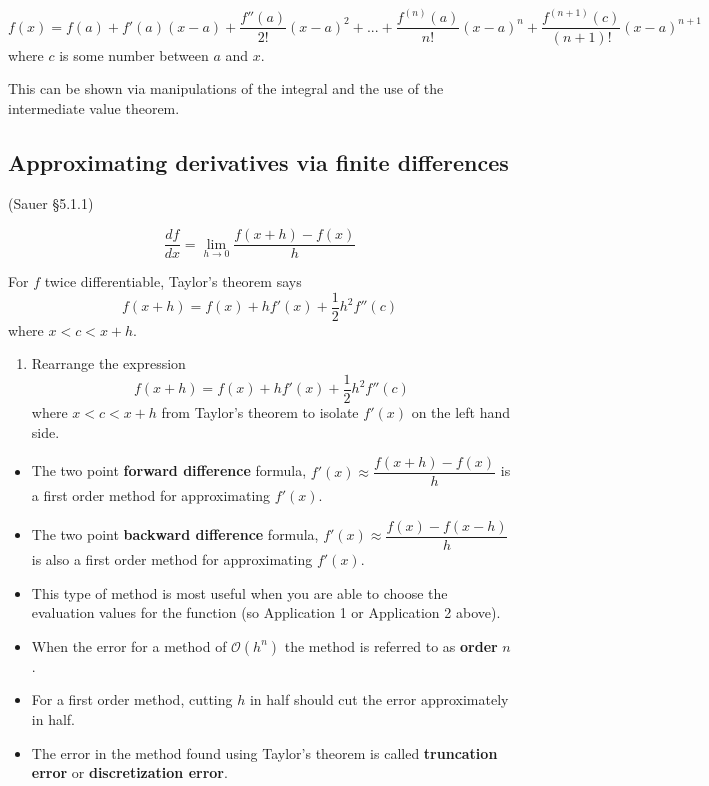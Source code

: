 \documentclass[12pt,letterpaper,noanswers]{exam}
\begin{document}
\[f(x) = f(a) + f'(a)(x-a) + \frac{f''(a)}{2!} (x-a)^2 + ... + \frac{f^{(n)}(a)}{n!}(x-a)^n + \dfrac{f^{(n+1)}(c)}{(n+1)!}(x-a)^{n+1}\]
where $c$ is some number between $a$ and $x$.

This can be shown via manipulations of the integral and the use of the intermediate value theorem.



\subsection*{Approximating derivatives via finite differences}
\begin{tcolorbox}

(Sauer \S 5.1.1)

\[\frac{df}{dx} = \lim\limits_{h\rightarrow 0} \frac{f(x+h)-f(x)}{h}\]

For $f$ twice differentiable, Taylor's theorem says
\[f(x+h) = f(x) + hf'(x) + \frac{1}{2}h^2 f''(c)\] where $x< c< x+h$.
\end{tcolorbox}
\begin{enumerate}[resume=classQ]
\item Rearrange the expression 
\[f(x+h) = f(x) + hf'(x) + \frac{1}{2}h^2 f''(c)\] where $x< c< x+h$
from Taylor's theorem to isolate $f'(x)$ on the left hand side.
\vspace{1in}

\end{enumerate}

\begin{tcolorbox}
\begin{itemize}
\itemsep0pt
    \item The two point \textbf{forward difference} formula, $f'(x)\approx \dfrac{f(x+h)-f(x)}{h}$ is a first order method for approximating $f'(x)$.
    \item The two point \textbf{backward difference} formula, $f'(x)\approx \dfrac{f(x)-f(x-h)}{h}$ is also a first order method for approximating $f'(x)$.
    \item This type of method is most useful when you are able to choose the evaluation values for the function (so Application 1 or Application 2 above).
    \item When the error for a method of $\mathcal{O}(h^n)$ the method is referred to as \textbf{order} $n$.
    \item For a first order method, cutting $h$ in half should cut the error approximately in half.
    \item The error in the method found using Taylor's theorem is called \textbf{truncation error} or \textbf{discretization error}.
\end{itemize}
\end{tcolorbox}
\end{document}

